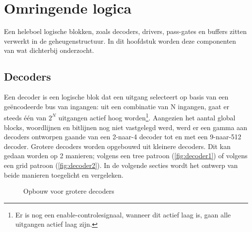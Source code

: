 \chapter{Omringende logica}
\label{periphery}

Een heleboel logische blokken, zoals decoders, drivers, pass-gates en buffers zitten verwerkt in de geheugenstructuur.
In dit hoofdstuk worden deze componenten van wat dichterbij onderzocht.

\section{Decoders}
Een decoder is een logische blok dat een uitgang selecteert op basis van een geëncodeerde bus van ingangen: uit een combinatie van N ingangen, gaat er steeds één van $2^N$ uitgangen actief hoog worden\footnote{Er is nog een enable-controlesignaal, wanneer dit actief laag is, gaan alle uitgangen actief laag zijn.}. Aangezien het aantal global blocks, woordlijnen en bitlijnen nog niet vastgelegd werd, werd er een gamma aan decoders ontworpen gaande van een 2-naar-4 decoder tot en met een 9-naar-512 decoder. Grotere decoders worden opgebouwd uit kleinere decoders. Dit kan gedaan worden op 2 manieren; volgens een tree patroon (\ref{fig:decoder1}) of volgens een grid patroon (\ref{fig:decoder2}). In de volgende secties wordt het ontwerp van beide manieren toegelicht en vergeleken.

\begin{figure}[!ht]
\centering
{}
\caption[Types decoders]{Opbouw voor grotere decoders}\label{fig:basisdecoders}
\end{figure}


